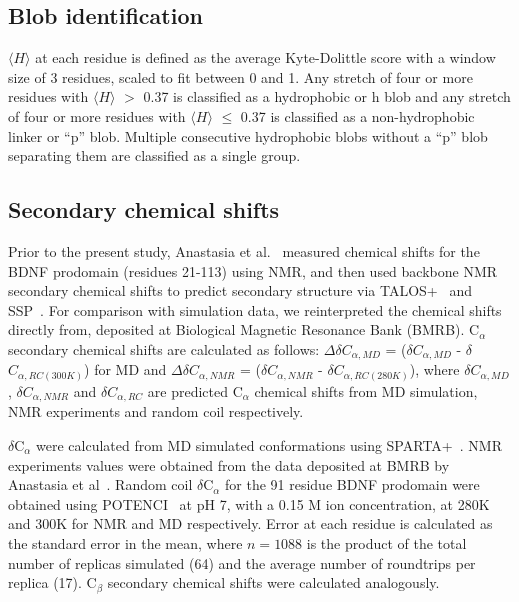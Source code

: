 \documentclass[10pt,letterpaper]{article}
\begin{document}
\subsection*{Blob identification} $\langle H\rangle$ at each residue is defined as the average Kyte-Dolittle\cite{Kyte1982a} score with a window size of 3 residues, scaled to fit between 0 and 1. Any stretch of four or more residues with $\langle H \rangle$ $>$ 0.37 is classified as a hydrophobic or h blob and any stretch of four or more residues with $\langle H \rangle$ $\leq$ 0.37 is classified as a non-hydrophobic linker or ``p'' blob. Multiple consecutive hydrophobic blobs without a ``p'' blob separating them are classified as a single group. 

\subsection*{Secondary chemical shifts} Prior to the present study, Anastasia et al.~\cite{Anastasia2013} measured chemical shifts for the BDNF prodomain (residues 21-113) using NMR, and then used backbone NMR secondary chemical shifts to predict secondary structure via TALOS+~\cite{Shen2009} and SSP~\cite{Marsh2006a}. For comparison with simulation data, we reinterpreted the chemical shifts directly from\cite{Anastasia2013}, deposited at Biological Magnetic Resonance Bank (BMRB). C$_{\alpha}$ secondary chemical shifts are calculated as follows: $\Delta$$\delta$$C_{\alpha,MD}$ = ($\delta$$C_{\alpha,MD}$ - $\delta$$C_{\alpha,RC(300K)}$) for MD and $\Delta$$\delta$$C_{\alpha, NMR}$ = ($\delta$$C_{\alpha, NMR}$ - $\delta$$C_{\alpha,RC(280K)}$), where $\delta$$C_{\alpha,MD}$, $\delta$$C_{\alpha,NMR}$ and $\delta$$C_{\alpha,RC}$ are predicted C$_{\alpha}$ chemical shifts from MD simulation, NMR experiments and random coil respectively. 

$\delta$C$_{\alpha}$ were calculated from MD simulated conformations using SPARTA+~\cite{Shen2010}. NMR experiments values were obtained from the data deposited at BMRB by Anastasia et al~\cite{Anastasia2013}.  
Random coil $\delta$C$_{\alpha}$ for the 91 residue BDNF prodomain were obtained using POTENCI~\cite{Nielsen2018} at pH 7, with a 0.15 M ion concentration, at 280K and 300K for NMR and MD respectively. Error at each residue is calculated as the standard error in the mean, where $n = 1088$ is the product of the total number of replicas simulated (64) and the average number of roundtrips per replica (17). C$_{\beta}$ secondary chemical shifts were calculated analogously.
\end{document}
